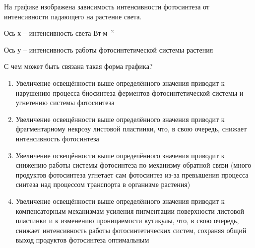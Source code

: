 
На графике изображена зависимость интенсивности фотосинтеза от интенсивности падающего на растение света.


Ось х – интенсивность света Вт$\cdot$м$^{-2}$

Ось у – интенсивность работы фотосинтетической системы растения

С чем может быть связана такая форма графика?

\begin{enumerate}
    \item Увеличение освещённости выше определённого значения приводит к нарушению процесса биосинтеза ферментов фотосинтетической системы и угнетению системы фотосинтеза
    \item Увеличение освещённости выше определённого значения приводит к фрагментарному некрозу листовой пластинки, что, в свою очередь, снижает интенсивность фотосинтеза
    \item Увеличение освещённости выше определённого значения приводит к снижению работы системы фотосинтеза по механизму обратной связи (много продуктов фотосинтеза угнетает сам фотосинтез из-за превышения процесса синтеза над процессом транспорта в организме растения)
    \item Увеличение освещённости выше определённого значения приводит к компенсаторным механизмам усиления пигментации поверхности листовой пластинки и к изменению проницаемости кутикулы, что, в свою очередь, снижает интенсивность работы фотосинтетических систем, сохраняя общий выход продуктов фотосинтеза оптимальным
\end{enumerate}